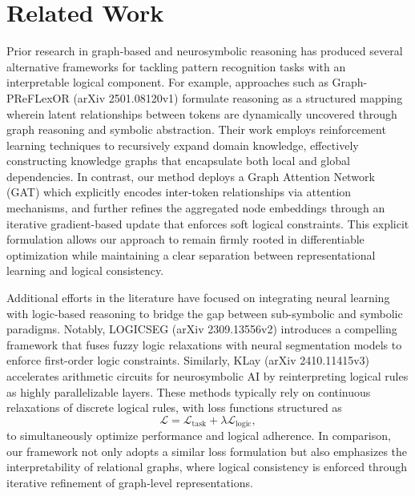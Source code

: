 \documentclass{article}
\begin{document}
\section{Related Work}
Prior research in graph-based and neurosymbolic reasoning has produced several alternative frameworks for tackling pattern recognition tasks with an interpretable logical component. For example, approaches such as Graph-PReFLexOR (arXiv 2501.08120v1) formulate reasoning as a structured mapping wherein latent relationships between tokens are dynamically uncovered through graph reasoning and symbolic abstraction. Their work employs reinforcement learning techniques to recursively expand domain knowledge, effectively constructing knowledge graphs that encapsulate both local and global dependencies. In contrast, our method deploys a Graph Attention Network (GAT) which explicitly encodes inter-token relationships via attention mechanisms, and further refines the aggregated node embeddings through an iterative gradient-based update that enforces soft logical constraints. This explicit formulation allows our approach to remain firmly rooted in differentiable optimization while maintaining a clear separation between representational learning and logical consistency.

Additional efforts in the literature have focused on integrating neural learning with logic-based reasoning to bridge the gap between sub-symbolic and symbolic paradigms. Notably, LOGICSEG (arXiv 2309.13556v2) introduces a compelling framework that fuses fuzzy logic relaxations with neural segmentation models to enforce first-order logic constraints. Similarly, KLay (arXiv 2410.11415v3) accelerates arithmetic circuits for neurosymbolic AI by reinterpreting logical rules as highly parallelizable layers. These methods typically rely on continuous relaxations of discrete logical rules, with loss functions structured as
\[
\mathcal{L} = \mathcal{L}_{\text{task}} + \lambda \mathcal{L}_{\text{logic}},
\]
to simultaneously optimize performance and logical adherence. In comparison, our framework not only adopts a similar loss formulation but also emphasizes the interpretability of relational graphs, where logical consistency is enforced through iterative refinement of graph-level representations.
\end{document}
